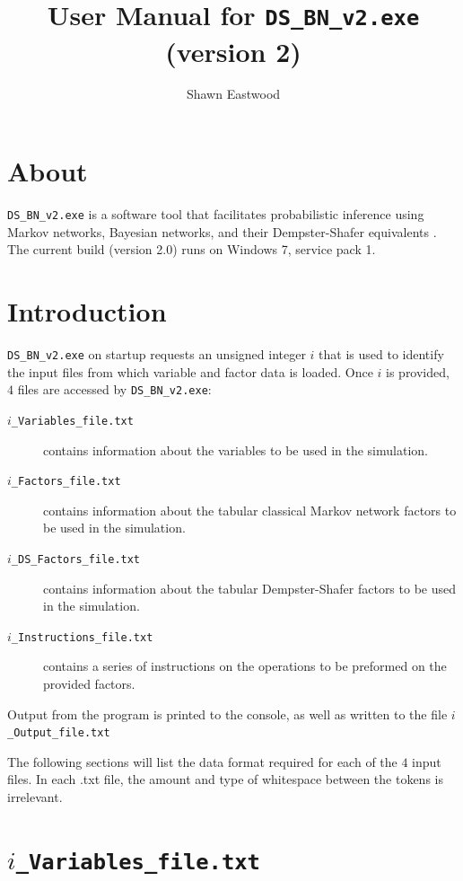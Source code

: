 \documentclass{article}
\title{User Manual for \texttt{DS\_BN\_v2.exe} (version 2)}
\author{Shawn Eastwood}
\date{}
\begin{document}
\maketitle

\section{About}

\texttt{DS\_BN\_v2.exe} is a software tool that facilitates probabilistic inference using Markov networks, Bayesian networks, and their Dempster-Shafer equivalents \cite{[Eastwood2015]}. The current build (version 2.0) runs on Windows 7, service pack 1.


\section{Introduction}

\texttt{DS\_BN\_v2.exe} on startup requests an unsigned integer $i$ that is used to identify the input files from which variable and factor data is loaded. Once $i$ is provided, $4$ files are accessed by \texttt{DS\_BN\_v2.exe}:
\begin{description}
\item[\texttt{$i$\_Variables\_file.txt}] contains information about the variables to be used in the simulation.
\item[\texttt{$i$\_Factors\_file.txt}] contains information about the tabular classical Markov network factors to be used in the simulation.
\item[\texttt{$i$\_DS\_Factors\_file.txt}] contains information about the tabular Dempster-Shafer factors to be used in the simulation.
\item[\texttt{$i$\_Instructions\_file.txt}] contains a series of instructions on the operations to be preformed on the provided factors.
\end{description}  
Output from the program is printed to the console, as well as written to the file \texttt{$i$\_Output\_file.txt}

The following sections will list the data format required for each of the $4$ input files. In each .txt file, the amount and type of whitespace between the tokens is irrelevant. 



\section{\texttt{$i$\_Variables\_file.txt}}
\end{document}

